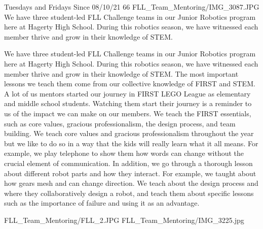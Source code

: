 {Tuesdays and Fridays Since 08/10/21}
{66}
{FLL_Team_Mentoring/IMG_3087.JPG}
{We have three student-led FLL Challenge teams in our Junior Robotics program here at Hagerty High School. During this robotics season, we have witnessed each member thrive and grow in their knowledge of STEM.}
{We have three student-led FLL Challenge teams in our Junior Robotics program here at Hagerty High School. During this robotics season, we have witnessed each member thrive and grow in their knowledge of STEM. The most important lessons we teach them come from our collective knowledge of FIRST and STEM. A lot of us mentors started our journey in FIRST LEGO League as elementary and middle school students. Watching them start their journey is a reminder to us of the impact we can make on our members. We teach the FIRST essentials, such as core values, gracious professionalism, the design process, and team building. We teach core values and gracious professionalism throughout the year but we like to do so in a way that the kids will really learn what it all means. For example, we play telephone to show them how words can change without the crucial element of communication. In addition, we go through a thorough lesson about different robot parts and how they interact. For example, we taught about how gears mesh and can change direction. We teach about the design process and where they collaboratively design a robot, and teach them about specific lessons such as the importance of failure and using it as an advantage.  

} 
{FLL_Team_Mentoring/FLL_2.JPG}
{FLL_Team_Mentoring/IMG_3225.jpg}